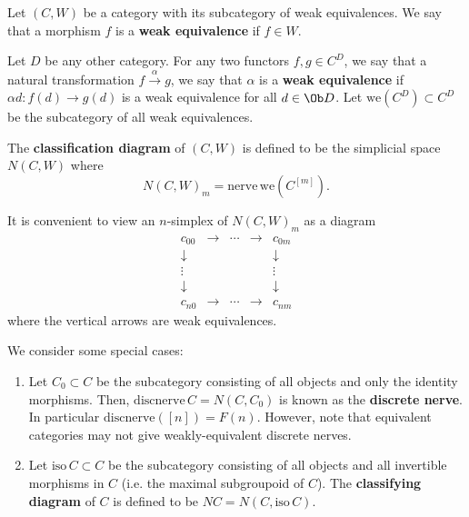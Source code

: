 \begin{defin}
Let $(C,W)$ be a category with its subcategory of weak equivalences. We say that a morphism $f$ is a {\bf weak equivalence} if $f\in W$.

Let $D$ be any other category. For any two functors $f,g\in C^D$, we say that a natural transformation $f\xrightarrow{\alpha}g$, we say that $\alpha$ is a {\bf weak equivalence} if $\alpha d \colon f(d) \to g(d)$ is a weak equivalence for all $d\in\Ob D$. Let $\mathrm{we}(C^D)\subset C^D$ be the subcategory of all weak equivalences.

The {\bf classification diagram} of $(C,W)$ is defined to be the simplicial space $N(C,W)$ where
\[
N(C,W)_m=\mathrm{nerve}\,\mathrm{we}(C^{[m]}).
\]
\end{defin}
It is convenient to view an $n$-simplex of $N(C,W)_m$ as a diagram
\[
\begin{matrix} c_{00}&\to&\cdots&\to&c_{0m}\\\downarrow&&&&\downarrow\\\vdots&&&&\vdots\\\downarrow&&&&\downarrow\\c_{n0}&\to&\cdots&\to&c_{nm}
\end{matrix}
\]
where the vertical arrows are weak equivalences.

We consider some special cases:
\begin{eg}\label{nerveeg}
\begin{enumerate}
\item Let $C_0\subset C$ be the subcategory consisting of all objects and only the identity morphisms. Then, $\mathrm{discnerve}\,C=N(C,C_0)$ is known as the {\bf discrete nerve}. In particular $\mathrm{discnerve}([n])=F(n)$. However, note that equivalent categories may not give weakly-equivalent discrete nerves.

\item Let $\mathrm{iso}\,C\subset C$ be the subcategory consisting of all objects and all invertible morphisms in $C$ (i.e. the maximal subgroupoid of $C$). The {\bf classifying diagram} of $C$ is defined to be $NC=N(C,\mathrm{iso}\,C)$.
\end{enumerate}
\end{eg}

